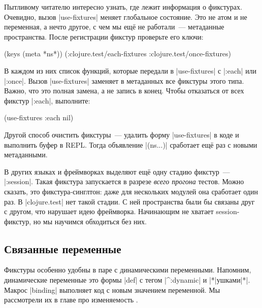 Пытливому читателю интересно узнать, где лежит информация о фикстурах. Очевидно,
вызов \spverb|use-fixtures| меняет глобальное состояние. Это не атом и не
переменная, а нечто другое, с чем мы ещ\"{е} не работали~--- метаданные
пространства. После регистрации фикстур проверьте его ключи:


\begin{english}
  \begin{clojure}
(keys (meta *ns*))
(:clojure.test/each-fixtures :clojure.test/once-fixtures)
  \end{clojure}
\end{english}

В каждом из них список функций, которые передали в \spverb|use-fixtures| с
\spverb|:each| или \spverb|:once|. Вызов \spverb|use-fixtures| заменяет в
метаданных все фикстуры этого типа. Важно, что это полная замена, а не запись в
конец. Чтобы отказаться от всех фикстур \spverb|:each|, выполните:

\begin{english}
  \begin{clojure}
(use-fixtures :each nil)
  \end{clojure}
\end{english}

Другой способ очистить фикстуры~--- удалить форму \spverb|use-fixtures| в коде и
выполнить буфер в REPL. Тогда объявление \spverb|(ns...)| сработает ещ\"{е} раз с
новыми метаданными.

В других языках и фреймворках выделяют ещ\"{е} одну стадию фикстур~---
\spverb|:session|. Такая фикстура запускается в разрезе \emph{всего прогона}
тестов. Можно сказать, это фикстура-синглтон: даже для нескольких модулей она
сработает один раз. В \spverb|clojure.test| нет такой стадии. С ней пространства
были бы связаны друг с другом, что нарушает идею фреймворка. Начинающим не
хватает session-фикстур, но мы научимся обходиться без них.

\subsection{Связанные переменные}


Фикстуры особенно удобны в паре с динамическими переменными. Напомним,
динамические переменные это формы \spverb|def| с тегом \spverb|^:dynamic| и
\spverb|*|ушками\spverb|*|. Макрос \spverb|binding| выполняет код с новым
значением переменной. Мы рассмотрели их в главе про
изменяемость .

